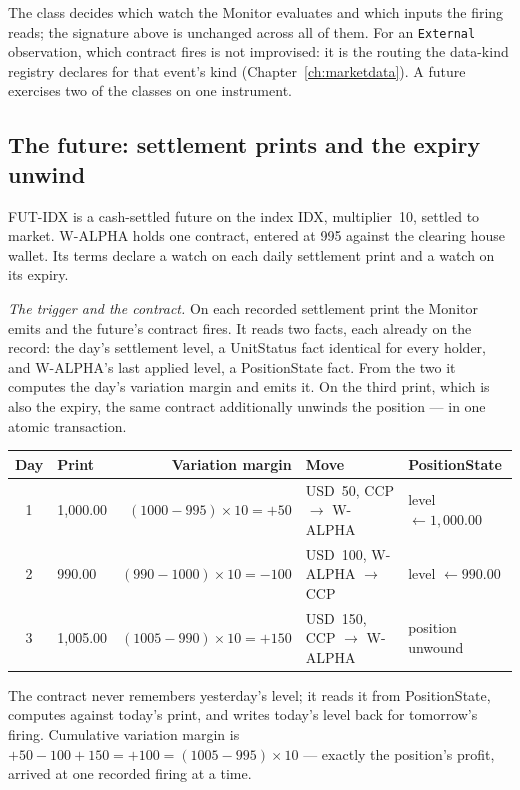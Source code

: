 \documentclass[11pt,a4paper]{article}
\newcommand{\USD}[1]{\mbox{USD~#1}}
\begin{document}
The class decides which watch the Monitor evaluates and which inputs the firing
reads; the signature above is unchanged across all of them. For an \texttt{External}
observation, which contract fires is not improvised: it is the routing the data-kind
registry declares for that event's kind (Chapter~\ref{ch:marketdata}). A future exercises
two of the classes on one instrument.

\subsection{The future: settlement prints and the expiry unwind}

FUT-IDX is a cash-settled future on the index IDX, multiplier~10, settled to
market. W-ALPHA holds one contract, entered at 995 against the clearing house
wallet. Its terms declare a watch on each daily settlement print and a watch on
its expiry.

\emph{The trigger and the contract.} On each recorded settlement print the
Monitor emits and the future's contract fires. It reads two facts, each already
on the record: the day's settlement level, a UnitStatus fact identical for every
holder, and W-ALPHA's last applied level, a PositionState fact. From the two it
computes the day's variation margin and emits it. On the third print, which is
also the expiry, the same contract additionally unwinds the position --- in one
atomic transaction.

\begin{center}
\small
\begin{tabular}{clrll}
\toprule
Day & Print & Variation margin & Move & PositionState \\
\midrule
1 & 1{,}000.00 & $(1000-995)\times 10 = +50$   & \USD{50}, CCP $\rightarrow$ W-ALPHA  & level $\leftarrow 1{,}000.00$ \\
2 & \phantom{0}990.00 & $(990-1000)\times 10 = -100$ & \USD{100}, W-ALPHA $\rightarrow$ CCP & level $\leftarrow 990.00$ \\
3 & 1{,}005.00 & $(1005-990)\times 10 = +150$  & \USD{150}, CCP $\rightarrow$ W-ALPHA & position unwound \\
\bottomrule
\end{tabular}
\end{center}

The contract never remembers yesterday's level; it reads it from PositionState,
computes against today's print, and writes today's level back for tomorrow's
firing. Cumulative variation margin is $+50-100+150 = +100 = (1005-995)\times 10$
--- exactly the position's profit, arrived at one recorded firing at a time.
\end{document}
